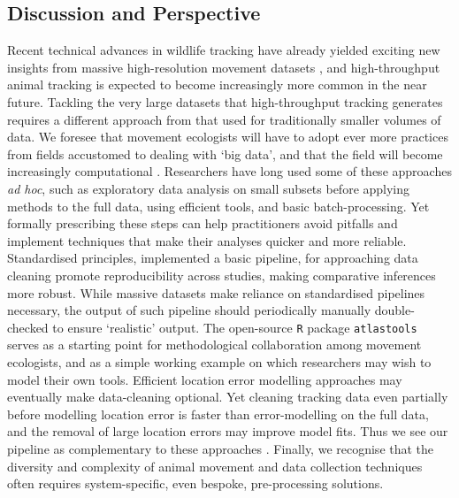 \begin{refsection}
    \section*{Discussion and Perspective}

    Recent technical advances in wildlife tracking have already yielded exciting new insights from massive high-resolution movement datasets \citep{aspillaga2021, aspillaga2021a, baktoft2017, baktoft2019, harel2016, harel2018, oudman2018, papageorgiou2019, tsoar2011, strandburg-peshkin2015, toledo2020, beardsworth2021a, beardsworth2021b, corl2020, vilk2021, lourie2021}, and high-throughput animal tracking is expected to become increasingly more common in the near future.
    Tackling the very large datasets that high-throughput tracking generates requires a different approach from that used for traditionally smaller volumes of data.
    We foresee that movement ecologists will have to adopt ever more practices from fields accustomed to dealing with `big data', and that the field will become increasingly computational \citep{peng2011}.
    Researchers have long used some of these approaches \textit{ad hoc}, such as exploratory data analysis on small subsets before applying methods to the full data, using efficient tools, and basic batch-processing. 
    Yet formally prescribing these steps can help practitioners avoid pitfalls and implement techniques that make their analyses quicker and more reliable.
    Standardised principles, implemented a basic pipeline, for approaching data cleaning promote reproducibility across studies, making comparative inferences more robust.
    While massive datasets make reliance on standardised pipelines necessary, the output of such pipeline should periodically manually double-checked to ensure `realistic' output.
    The open-source \texttt{R} package \texttt{atlastools} serves as a starting point for methodological collaboration among movement ecologists, and as a simple working example on which researchers may wish to model their own tools.
    Efficient location error modelling approaches \citep{fleming2020, aspillaga2021} may eventually make data-cleaning optional.
    Yet cleaning tracking data even partially before modelling location error is faster than error-modelling on the full data, and the removal of large location errors may improve model fits.
    Thus we see our pipeline as complementary to these approaches \citep{fleming2014a, fleming2020}.
    Finally, we recognise that the diversity and complexity of animal movement and data collection techniques often requires system-specific, even bespoke, pre-processing solutions.

\end{refsection}
